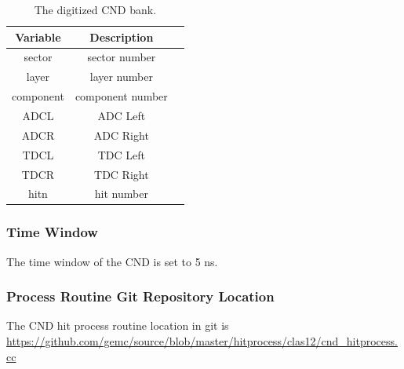 \begin{table}[h]
	\begin{center}
		\begin{tabular}{| c | c | c |}
			\hline \hline
			Variable         & Description   \\
			\hline
              sector  &                                     sector number     \\
               layer  &                                      layer number     \\
           component  &                                  component number     \\
                ADCL  &                                          ADC Left     \\
                ADCR  &                                         ADC Right     \\
                TDCL  &                                          TDC Left     \\
                TDCR  &                                         TDC Right     \\
                hitn  &                                        hit number     \\
			\hline \hline
		\end{tabular}
	\end{center}
	\caption{The digitized CND bank.}\label{tab:cndBank}
\end{table}


\subsubsection{Time Window}
The time window  of the CND is set to 5 ns.


\subsubsection{Process Routine Git Repository Location}
The CND hit process routine location in git is \url{https://github.com/gemc/source/blob/master/hitprocess/clas12/cnd_hitprocess.cc}
